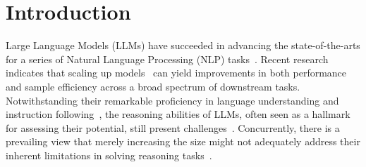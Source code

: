 \section{Introduction}


Large Language Models (LLMs) have succeeded in advancing the state-of-the-arts for a series of Natural Language Processing (NLP) tasks~\citep[][\emph{inter alia}]{brown2020GPT3, chowdhery2022palm, openai2023gpt4, touvron2023llama2, zhao2023survey}.
Recent research~\citep{wei2022emergent} indicates that scaling up models~\citep{kaplan2020scaling} can yield improvements in both performance and sample efficiency across a broad spectrum of downstream tasks.
Notwithstanding their remarkable proficiency in language understanding and instruction following~\citep{ouyang2022training}, 
the reasoning abilities of LLMs, 
often seen as a hallmark for assessing their potential, 
still present challenges~\citep{suzgun2023bbh, huang2023towards}.
Concurrently,
there is a prevailing view that merely increasing the size might not adequately address their inherent limitations in solving reasoning tasks~\citep{rae2021scaling}.


